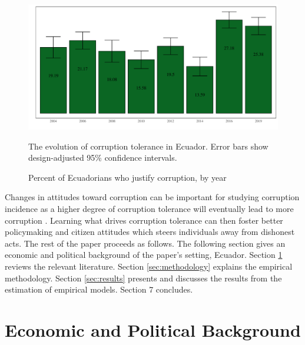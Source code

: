 \documentclass[12pt,a4]{article}\usepackage[]{graphicx}\usepackage[]{xcolor}
\makeatletter
\def\maxwidth{ %
  \ifdim\Gin@nat@width>\linewidth
    \linewidth
  \else
    \Gin@nat@width
  \fi
}
\newenvironment{knitrout}{}{} %
\makeatother
\begin{document}
\begin{figure}[htbp!]
\begin{knitrout}
\color{fgcolor}

{\centering \includegraphics[width=\maxwidth]{figure/ctol_graph-1} 

}


\end{knitrout}
\caption{Percent of Ecuadorians who justify corruption, by year}
\label{fig:ctoly}
The evolution of corruption tolerance in Ecuador. Error bars show design-adjusted 95\% confidence intervals.
\end{figure}

Changes in attitudes toward corruption can be important for studying corruption incidence as a higher degree of corruption tolerance will eventually lead to more corruption \parencite{Campbell.2014, Ariely.2019}. Learning what drives corruption tolerance can then foster better policymaking and citizen attitudes which steers individuals away from dishonest acts. The rest of the paper proceeds as follows. The following section gives an economic and political background of the paper's setting, Ecuador. Section \ref{sec:background} reviews the relevant literature. Section \ref{sec:methodology} explains the empirical methodology. Section \ref{sec:results} presents and discusses the results from the estimation of empirical models. Section 7 concludes. 




\section{Economic and Political Background}
\label{sec:background}
\end{document}
